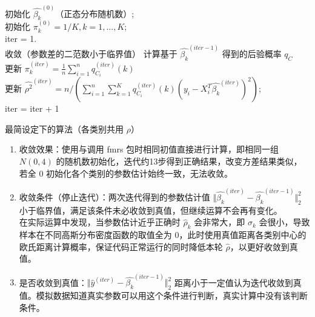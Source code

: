 \documentclass[12pt, a4paper, oneside]{article}
\numberwithin{equation}{section}
\begin{document}
\IncMargin{1em} %
\begin{algorithm}
	
	
	\BlankLine
	
	初始化 $\hat{\beta_k}^{(0)}$（正态分布随机数）;\\
	初始化 $\pi_k^{(0)} = 1/K, k = 1,...,K$; \\
	iter = 1.\\
	\Repeat
	{收敛（参数差的二范数小于临界值）}
	{
		计算基于 $\hat{\beta_k}^{(iter-1)}$ 得到的后验概率 $q_C$\\
		更新 $\pi^{(iter)}_k = \frac{1}{n}\sum_{i=1}^{n}q^{(iter)}_{C_i}(k)$ \\
	更新 $\hat{\rho^2}^{(iter)} = n/\left({\sum_{i=1}^{n}\sum_{k=1}^{K}q^{(iter)}_{C_i}(k)(y_i - X_i^T \hat{\beta_k}^{(iter)})^2}\right)$; \\
	iter = iter + 1
	}
	\caption{最简设定下的算法（各类别共用 $\rho$）}
	\label{alg:simplest}
\end{algorithm}
\DecMargin{1em}

\begin{enumerate}
	\item 收敛效果：使用与调用 fmrs 包时相同初值直接进行计算，即相同一组 $N(0, 4)$ 的随机数初始化，迭代约13步得到正确结果，改变方差结果类似，若全 0 初始化各个类别的参数估计始终一致，无法收敛。
	\item 收敛条件（停止迭代）：两次迭代得到的参数估计值 $\Vert\hat{\beta_k}^{(iter)}-\hat{\beta_k}^{(iter-1)}\Vert_2^2$ 小于临界值，满足该条件未必收敛到真值，但继续运算不会再有变化。\\在实际运算中发现，当参数估计近乎正确时 $\hat{\rho}_k$ 会非常大，即 $\sigma_k$ 会很小，导致样本在不同高斯分布密度函数的取值全为 0，此时使用真值距离各类别中心的欧氏距离计算概率，保证代码正常运行的同时降低本轮 $\hat\rho$，以更好收敛到真值。
	\item 是否收敛到真值：$\Vert\hat{y}^{(iter)}-\hat{\beta_k}^{(iter-1)}\Vert_2^2$ 距离小于一定值认为迭代收敛到真值。模拟数据知道真实参数可以用这个条件进行判断，真实计算中没有该判断条件。
\end{enumerate}
\end{document}
